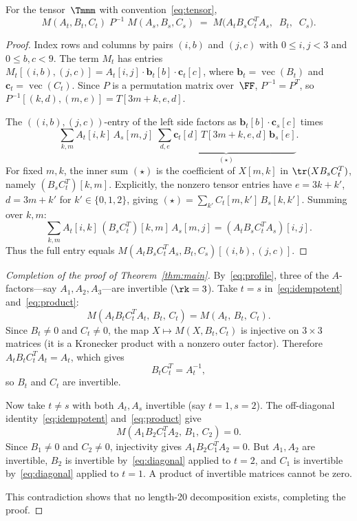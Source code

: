 \documentclass[11pt,a4paper]{article}
\begin{document}
\begin{proposition}\label{prop:product}
  For the tensor~$\Tmmm$ with convention~\eqref{eq:tensor},
  \begin{equation}\label{eq:product}
    M(A_t,B_t,C_t)\;P^{-1}\;M(A_s,B_s,C_s)
    \;=\;
    M\bigl(A_t B_s C_t^T A_s,\;\; B_t,\;\; C_s\bigr).
  \end{equation}
\end{proposition}

\begin{proof}
  Index rows and columns by pairs $(i,b)$ and $(j,c)$ with $0\le i,j<3$ and $0\le b,c<9$.  The term $M_t$ has entries $M_t[(i,b),(j,c)] = A_t[i,j]\cdot\mathbf{b}_t[b]\cdot\mathbf{c}_t[c]$, where $\mathbf{b}_t=\operatorname{vec}(B_t)$ and $\mathbf{c}_t=\operatorname{vec}(C_t)$.  Since $P$ is a permutation matrix over~$\FF$, $P^{-1}=P^T$, so $P^{-1}[(k,d),(m,e)]=T[3m+k,e,d]$.

  The $((i,b),(j,c))$-entry of the left side factors as $\mathbf{b}_t[b]\cdot\mathbf{c}_s[c]$ times
  \[
    \sum_{k,m} A_t[i,k]\,A_s[m,j] \;\underbrace{\sum_{d,e}\mathbf{c}_t[d]\,T[3m+k,e,d]\,\mathbf{b}_s[e]}_{(\star)}.
  \]
  For fixed $m,k$, the inner sum $(\star)$ is the coefficient of $X[m,k]$ in $\tr(XB_sC_t^T)$, namely $(B_sC_t^T)[k,m]$. Explicitly, the nonzero tensor entries have $e=3k+k'$, $d=3m+k'$ for $k'\in\{0,1,2\}$, giving $(\star)=\sum_{k'}C_t[m,k']\,B_s[k,k']$. Summing over $k,m$:
  \[
    \sum_{k,m}A_t[i,k]\,(B_sC_t^T)[k,m]\,A_s[m,j] = (A_tB_sC_t^TA_s)[i,j].
  \]
  Thus the full entry equals $M(A_tB_sC_t^TA_s,B_t,C_s)[(i,b),(j,c)]$.
\end{proof}

\begin{proof}[Completion of the proof of Theorem~\ref{thm:main}]
  By~\eqref{eq:profile}, three of the $A$-factors---say $A_1,A_2,A_3$---are invertible ($\rk=3$).  Take $t=s$ in~\eqref{eq:idempotent} and~\eqref{eq:product}:
  \[
    M(A_tB_tC_t^TA_t,\,B_t,\,C_t) = M(A_t,\,B_t,\,C_t).
  \]
  Since $B_t\ne 0$ and $C_t\ne 0$, the map $X\mapsto M(X,B_t,C_t)$ is injective on $3\times 3$ matrices (it is a Kronecker product with a nonzero outer factor).  Therefore $A_tB_tC_t^TA_t=A_t$, which gives
  \begin{equation}\label{eq:diagonal}
    B_tC_t^T = A_t^{-1},
  \end{equation}
  so $B_t$ and $C_t$ are invertible.

  Now take $t\ne s$ with both $A_t,A_s$ invertible (say $t=1,s=2$).  The off-diagonal identity~\eqref{eq:idempotent} and~\eqref{eq:product} give
  \begin{equation}\label{eq:off-diagonal-zero}
    M(A_1B_2C_1^TA_2,\,B_1,\,C_2) = 0.
  \end{equation}
  Since $B_1\ne 0$ and $C_2\ne 0$, injectivity gives $A_1B_2C_1^TA_2=0$.  But $A_1,A_2$ are invertible, $B_2$ is invertible by~\eqref{eq:diagonal} applied to $t=2$, and $C_1$ is invertible by~\eqref{eq:diagonal} applied to $t=1$.  A product of invertible matrices cannot be zero.

  This contradiction shows that no length-20 decomposition exists, completing the proof.
\end{proof}
\end{document}
